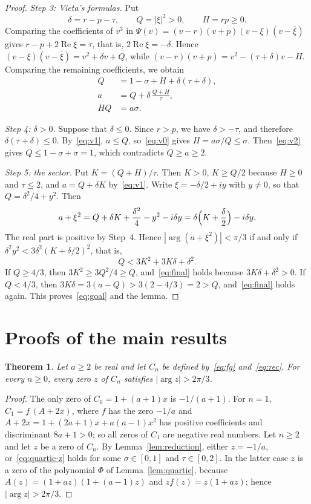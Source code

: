 \documentclass{amsart}
\newtheorem{theorem}{Theorem}[section]
\theoremstyle{remark}
\numberwithin{equation}{section}
\begin{document}
\begin{proof}
\emph{Step 3: Vieta's formulas.} Put
\[
\delta=r-p-\tau,\qquad Q=|\xi|^2>0,\qquad H=rp\ge 0 .
\]
Comparing the coefficients of $v^3$ in
$\Psi(v)=(v-r)(v+p)(v-\xi)(v-\overline{\xi})$ gives
$r-p+2\operatorname{Re}\xi=\tau$, that is, $2\operatorname{Re}\xi=-\delta$.
Hence $(v-\xi)(v-\overline{\xi})=v^2+\delta v+Q$, while
$(v-r)(v+p)=v^2-(\tau+\delta)v-H$. Comparing the remaining coefficients, we
obtain
\begin{align}
Q&=1-\sigma+H+\delta(\tau+\delta),\label{eq:v2}\\
a&=Q+\delta\,\frac{Q+H}{\tau},\label{eq:v1}\\
HQ&=a\sigma .\label{eq:v0}
\end{align}

\emph{Step 4: $\delta>0$.} Suppose that $\delta\le 0$. Since $r>p$, we have
$\delta>-\tau$, and therefore $\delta(\tau+\delta)\le 0$. By~\eqref{eq:v1},
$a\le Q$, so~\eqref{eq:v0} gives $H=a\sigma/Q\le\sigma$. Then~\eqref{eq:v2}
gives $Q\le 1-\sigma+\sigma=1$, which contradicts $Q\ge a\ge 2$.

\emph{Step 5: the sector.} Put $K=(Q+H)/\tau$. Then $K>0$, $K\ge Q/2$
because $H\ge 0$ and $\tau\le 2$, and $a=Q+\delta K$ by~\eqref{eq:v1}.
Write $\xi=-\delta/2+iy$ with $y\ne 0$, so that $Q=\delta^2/4+y^2$. Then
\[
a+\xi^2=Q+\delta K+\frac{\delta^2}{4}-y^2-i\delta y
=\delta\Bigl(K+\frac{\delta}{2}\Bigr)-i\delta y .
\]
The real part is positive by Step~4. Hence $|\arg(a+\xi^2)|<\pi/3$ if and
only if $\delta^2y^2<3\delta^2(K+\delta/2)^2$, that is,
\begin{equation}\label{eq:final}
Q<3K^2+3K\delta+\delta^2 .
\end{equation}
If $Q\ge 4/3$, then $3K^2\ge 3Q^2/4\ge Q$, and~\eqref{eq:final} holds
because $3K\delta+\delta^2>0$. If $Q<4/3$, then
$3K\delta=3(a-Q)>3(2-4/3)=2>Q$, and~\eqref{eq:final} holds again. This
proves~\eqref{eq:goal} and the lemma.
\end{proof}

\section{Proofs of the main results}\label{sec:proofs}

\begin{theorem}\label{thm:general}
Let $a\ge 2$ be real and let $C_n$ be defined by~\eqref{eq:fg}
and~\eqref{eq:rec}. For every $n\ge 0$, every zero $z$ of $C_n$ satisfies
$|\arg z|>2\pi/3$.
\end{theorem}

\begin{proof}
The only zero of $C_0=1+(a+1)x$ is $-1/(a+1)$. For $n=1$,
$C_1=f\,(A+2x)$, where $f$ has the zero $-1/a$ and
$A+2x=1+(2a+1)x+a(a-1)x^2$ has positive coefficients and discriminant
$8a+1>0$; so all zeros of $C_1$ are negative real numbers. Let $n\ge 2$ and
let $z$ be a zero of $C_n$. By Lemma~\ref{lem:reduction}, either $z=-1/a$,
or~\eqref{eq:quartic-z} holds for some $\sigma\in[0,1]$ and
$\tau\in[0,2]$. In the latter case $z$ is a zero of the polynomial $\Phi$
of Lemma~\ref{lem:quartic}, because $A(z)=(1+az)(1+(a-1)z)$ and
$zf(z)=z(1+az)$; hence $|\arg z|>2\pi/3$.
\end{proof}
\end{document}
